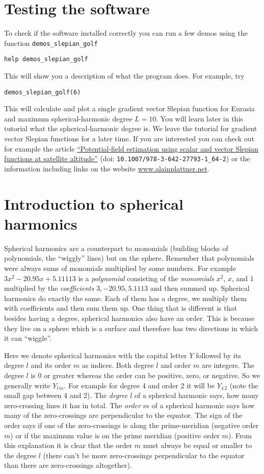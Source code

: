 \documentclass[11pt]{article}
\newcommand{\Yfun}{Y}
\begin{document}
\section{Testing the software}\label{testing}
To check if the software installed correctly you can run a few demos
using the function \verb+demos_slepian_golf+

\qquad \verb+help demos_slepian_golf+

This will show you a description of what the program does. For
example, try

\qquad \verb+demos_slepian_golf(6)+

This will calculate and plot a single gradient vector Slepian function
for Eurasia and maximum spherical-harmonic degree $L=10$. You will
learn later in this tutorial what the spherical-harmonic degree is.
We leave the tutorial for gradient vector Slepian functions for a
later time. If you are interested you can check out for example the
article
\href{https://doi.org/10.1007/978-3-642-27793-1_64-2}{``Potential-field
  estimation using scalar and vector Slepian functions at satellite
  altitude''} (doi: \verb+10.1007/978-3-642-27793-1_64-2+) or the information
including links on the website \url{www.alainplattner.net}.


\section{Introduction to spherical harmonics}\label{sphintro}

Spherical harmonics are a counterpart to monomials (building blocks of
polynomials, the ``wiggly'' lines) but on the sphere. Remember that
polynomials were always sums of monomials multiplied by some
numbers. For example $3x^2 - 20.95x + 5.11113$ is a \emph{polynomial}
consisting of the \emph{monomials} $x^2$, $x$, and $1$ multiplied by
the \emph{coefficients} $3, -20.95, 5.1113$ and then summed
up. Spherical harmonics do exactly the same. Each of them has a
degree, we multiply them with coefficients and then sum them up. One
thing that is different is that besides having a degree, spherical
harmonics also have an order. This is because they live on a sphere
which is a surface and therefore has two directions in which it can
``wiggle''.

Here we denote spherical harmonics with the capital letter $\Yfun$
followed by its degree $l$ and its order $m$ as indices. Both degree
$l$ and order $m$ are integers. The degree $l$ is 0 or greater whereas
the order can be positive, zero, or negative. So we generally write
$\Yfun_{l\,m}$. For example for degree 4 and order 2 it will be
$\Yfun_{4\,2}$ (note the small gap between 4 and 2). The \emph{degree}
$l$ of a spherical harmonic says, how many zero-crossing lines it has
in total. The \emph{order} $m$ of a spherical harmonic says how many
of the zero-crossings are perpendicular to the equator. The sign of
the order says if one of the zero-crossings is along the
prime-meridian (negative order $m$) or if the maximum value is on the
prime meridian (positive order $m$). From this explanation it is clear
that the order $m$ must always be equal or smaller to the degree $l$
(there can't be more zero-crossings perpendicular to the equator than
there are zero-crossings altogether).
\end{document}
